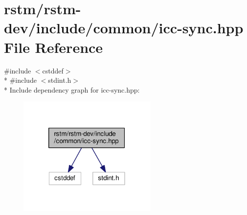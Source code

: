 \hypertarget{icc-sync_8hpp}{\section{rstm/rstm-\/dev/include/common/icc-\/sync.hpp File Reference}
\label{icc-sync_8hpp}
}
{\ttfamily \#include $<$cstddef$>$}\\*
{\ttfamily \#include $<$stdint.\-h$>$}\\*
Include dependency graph for icc-\/sync.hpp\-:
\nopagebreak
\begin{figure}[H]
\begin{center}
\leavevmode
\includegraphics[width=195pt]{icc-sync_8hpp__incl}
\end{center}
\end{figure}
